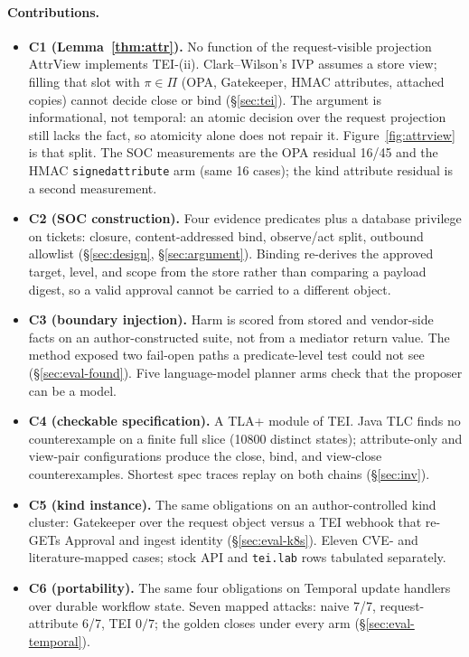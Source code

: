\documentclass[acmsmall,manuscript,review,anonymous]{acmart}
\renewcommand{\_}{\discretionary{\textunderscore}{}{\textunderscore}}
\begin{document}
\paragraph{Contributions.}
\begin{itemize}
  \item \textbf{C1 (Lemma~\ref{thm:attr}).} No function of the
  request-visible projection $\mathrm{AttrView}$ implements TEI-(ii).
  Clark--Wilson's {IVP} assumes a store view; filling that slot with
  $\pi\in\Pi$ ({OPA}, Gatekeeper, {HMAC} attributes, attached copies)
  cannot decide close or bind (\S\ref{sec:tei}). The argument is
  informational, not temporal: an atomic decision over the request
  projection still lacks the fact, so atomicity alone does not repair it.
  Figure~\ref{fig:attrview} is that split. The {SOC} measurements are the
  {OPA} residual 16/45 and the {HMAC} \texttt{signed\_attribute} arm
  (same 16 cases); the kind attribute residual is a second measurement.
  \item \textbf{C2 (SOC construction).} Four evidence predicates plus a
  database privilege on tickets: closure, content-addressed bind, observe/act
  split, outbound allowlist (\S\ref{sec:design}, \S\ref{sec:argument}).
  Binding re-derives the approved target, level, and scope from the store
  rather than comparing a payload digest, so a valid approval cannot be
  carried to a different object.
  \item \textbf{C3 (boundary injection).} Harm is scored from stored and
  vendor-side facts on an author-constructed suite, not from a mediator
  return value. The method exposed two fail-open paths a predicate-level
  test could not see (\S\ref{sec:eval-found}). Five language-model planner
  arms check that the proposer can be a model.
  \item \textbf{C4 (checkable specification).} A {TLA+} module of {TEI}.
  Java {TLC} finds no counterexample on a finite full slice (10800
  distinct states); attribute-only and view-pair configurations produce
  the close, bind, and view-close counterexamples. Shortest spec traces
  replay on both chains (\S\ref{sec:inv}).
  \item \textbf{C5 (kind instance).} The same obligations on an
  author-controlled kind cluster: Gatekeeper over the request object
  versus a {TEI} webhook that re-{GET}s Approval and ingest identity
  (\S\ref{sec:eval-k8s}). Eleven {CVE}- and literature-mapped cases;
  stock {API} and \texttt{tei.lab} rows tabulated separately.
  \item \textbf{C6 (portability).} The same four obligations on
  {Temporal} update handlers over durable workflow state. Seven mapped
  attacks: naive 7/7, request-attribute 6/7, {TEI} $0/7$; the golden
  closes under every arm (\S\ref{sec:eval-temporal}).
\end{itemize}
\end{document}
